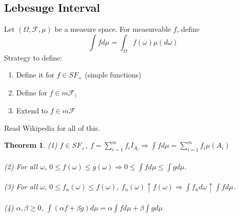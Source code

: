 \documentclass[12pt]{article}
\newtheorem{theorem}{Theorem}
\begin{document}
\subsection{Lebesuge Interval}
Let $(\Omega, \mathcal{F}, \mu)$ be a measure space.  For measureable $f$, define
$$\int f d \mu = \int_\Omega f(\omega) \mu(d \omega)$$
Strategy to define:
\begin{enumerate}
\item Define it for $f \in SF_+$ (simple functions)
\item Define for $f \in m \mathcal{F}_)$
\item Extend to $f \in m \mathcal{F}$
\end{enumerate}
Read Wikipedia for all of this.

\begin{theorem}
(1) $f \in SF_+$, $f = \sum_{i=1}^m f_i I_{A_i} \Rightarrow \int f d \mu = \sum_{i=1}^m f_i \mu(A_i)$ \\ \\
(2) For all $\omega$, $0 \le f(\omega) \le g(\omega) \Rightarrow 0 \le \int f d \mu \le \int g d \mu$.
\\ \\
(3) For all $\omega$, $0 \le f_n(\omega) \le f (\omega)$, $f_n(\omega) \uparrow f(\omega) \Rightarrow \int f_n d \omega \uparrow \int f  d \mu$.
\\ \\
(4) $\alpha, \beta \ge 0$, $\int(\alpha f + \beta g) d \mu = \alpha \int f d \mu + \beta \int g d \mu$
\end{theorem}
\end{document}
